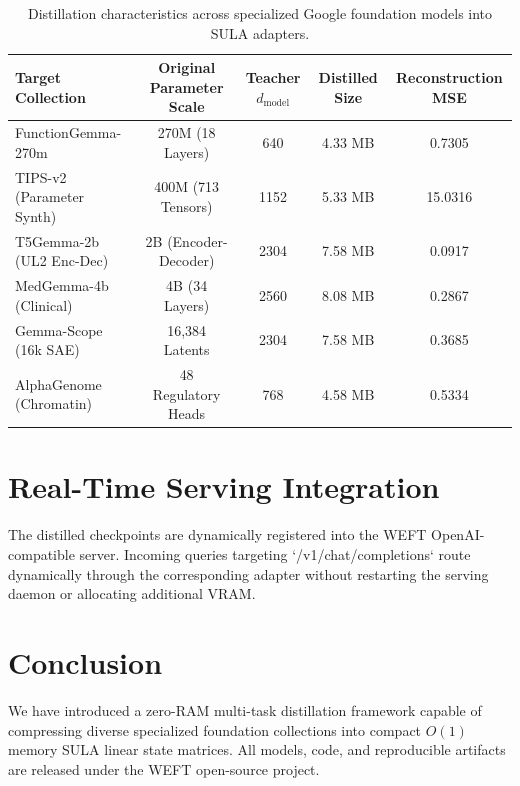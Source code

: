 \documentclass[11pt,a4paper]{article}
\begin{document}
\begin{table}[h]
\centering
\small
\begin{tabular}{lcccc}
\toprule
\textbf{Target Collection} & \textbf{Original Parameter Scale} & \textbf{Teacher $d_{\text{model}}$} & \textbf{Distilled Size} & \textbf{Reconstruction MSE} \\
\midrule
FunctionGemma-270m & 270M (18 Layers) & 640 & 4.33 MB & 0.7305 \\
TIPS-v2 (Parameter Synth) & 400M (713 Tensors) & 1152 & 5.33 MB & 15.0316 \\
T5Gemma-2b (UL2 Enc-Dec) & 2B (Encoder-Decoder) & 2304 & 7.58 MB & 0.0917 \\
MedGemma-4b (Clinical) & 4B (34 Layers) & 2560 & 8.08 MB & 0.2867 \\
Gemma-Scope (16k SAE) & 16,384 Latents & 2304 & 7.58 MB & 0.3685 \\
AlphaGenome (Chromatin) & 48 Regulatory Heads & 768 & 4.58 MB & 0.5334 \\
\bottomrule
\end{tabular}
\caption{Distillation characteristics across specialized Google foundation models into SULA adapters.}
\end{table}

\section{Real-Time Serving Integration}
The distilled checkpoints are dynamically registered into the WEFT OpenAI-compatible server. Incoming queries targeting `/v1/chat/completions` route dynamically through the corresponding adapter without restarting the serving daemon or allocating additional VRAM.

\section{Conclusion}
We have introduced a zero-RAM multi-task distillation framework capable of compressing diverse specialized foundation collections into compact $O(1)$ memory SULA linear state matrices. All models, code, and reproducible artifacts are released under the WEFT open-source project.
\end{document}
